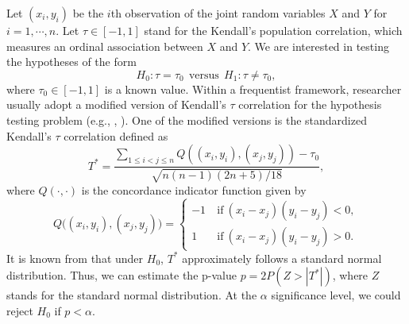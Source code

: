 \documentclass[11pt]{article}
\begin{document}
Let $(x_i, y_i)$ be the $i$th observation of the joint random variables $X$ and $Y$ for $i = 1, \cdots, n$. Let $\tau \in [-1, 1]$ stand for the Kendall's population correlation, which measures an ordinal association between $X$ and $Y$. We are interested in testing the hypotheses of the form
\begin{equation} \label{test:setting:01}
H_0: \tau =  \tau_0 \ \ \mathrm{versus} \ \ H_1: \tau \neq  \tau_0,
\end{equation}
where $\tau_0 \in [-1, 1]$ is a known value. Within a frequentist framework,
researcher usually adopt a modified version of Kendall's $\tau$ correlation for the hypothesis testing problem (e.g., \citeauthor{samara1988test}, \citeyear{samara1988test}). One of the modified versions is the standardized Kendall's $\tau$ correlation defined as
\begin{equation} \label{T:test}
   T^\ast =\frac{\sum\limits_{1\leq i< j\leq n}Q((x_i,y_i),(x_j, y_j)) - \tau_0}{\sqrt{n(n-1)(2n+5)/18}},
\end{equation}
where $Q(\cdot, \cdot)$ is the concordance indicator function given by
\begin{equation*}
    Q\bigl((x_i,y_i),(x_j, y_j) \bigr)=\left\{\begin{array}{cc}
       -1  & ~\text{if}~(x_i-x_j)(y_i - y_j)<0,  \\
        1 &  ~\text{if}~(x_i-x_j)(y_i - y_j)>0.
    \end{array}\right.
\end{equation*}
It is known from \cite{Noet:1955} that under $H_0$, $T^\ast$ approximately follows a standard normal distribution. Thus, we can estimate the p-value $p = 2P(Z >|T^\ast|)$, where $Z$ stands for the standard normal distribution. At the $\alpha$ significance level, we could reject $H_0$ if $p < \alpha$.
\end{document}
